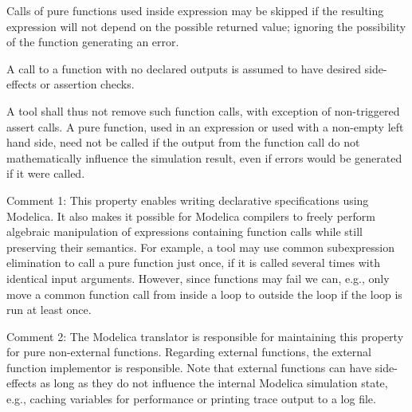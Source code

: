 Calls of pure functions used inside expression may be skipped if the
resulting expression will not depend on the possible returned value;
ignoring the possibility of the function generating an error.

A call to a function with no declared outputs is assumed to have desired
side-effects or assertion checks.

\begin{nonnormative}
A tool shall thus not remove such function calls, with exception of non-triggered assert calls.  A pure function, used in an expression or used with
a non-empty left hand side, need not be called if the output from the function call do not mathematically influence the simulation result, even if
errors would be generated if it were called.
\end{nonnormative}

\begin{nonnormative}
Comment 1: This property enables writing declarative
specifications using Modelica. It also makes it possible for Modelica
compilers to freely perform algebraic manipulation of expressions
containing function calls while still preserving their semantics. For
example, a tool may use common subexpression elimination to call a pure
function just once, if it is called several times with identical input
arguments. However, since functions may fail we can, e.g., only move a
common function call from inside a loop to outside the loop if the loop
is run at least once.
\end{nonnormative}

\begin{nonnormative}
Comment 2: The Modelica translator is responsible for
maintaining this property for pure non-external functions. Regarding
external functions, the external function implementor is responsible.
Note that external functions can have side-effects as long as they do
not influence the internal Modelica simulation state, e.g., caching
variables for performance or printing trace output to a log file.
\end{nonnormative}

